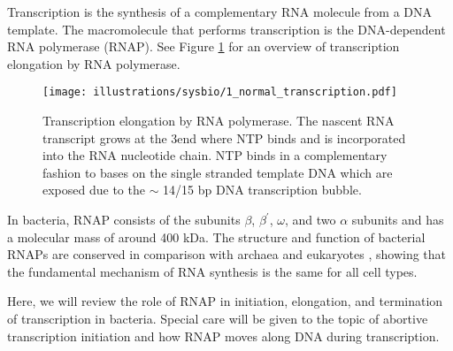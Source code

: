 %
%
Transcription is the synthesis of a complementary RNA molecule from a DNA
template. The macromolecule that performs transcription is the DNA-dependent
RNA polymerase (RNAP). See Figure \ref{fig:transcription_elongation} for an
overview of transcription elongation by RNA polymerase.

\begin{figure}[htb]
    \begin{center}
        \texttt{[image: illustrations/sysbio/1\_normal\_transcription.pdf]}
    \end{center}
    \caption{Transcription elongation by RNA polymerase. The nascent RNA
    transcript grows at the 3\protect\ppp end where NTP binds and is
    incorporated into the RNA nucleotide chain. NTP binds in a complementary
    fashion to bases on the single stranded template DNA which are exposed due
    to the $\sim$ 14/15 bp DNA transcription bubble.}
    \label{fig:transcription_elongation}
\end{figure}

In bacteria, RNAP consists of the subunits $\beta$, $\beta^{\prime}$, $\omega$,
and two $\alpha$ subunits and has a molecular mass of around 400 kDa. The
structure and function of bacterial RNAPs are conserved in comparison with
archaea and eukaryotes \cite{borukhov_rna_2008}, showing that the fundamental
mechanism of RNA synthesis is the same for all cell types.

Here, we will review the role of RNAP in initiation, elongation, and
termination of transcription in bacteria. Special care will be given to the
topic of abortive transcription initiation and how RNAP moves along DNA during
transcription.

